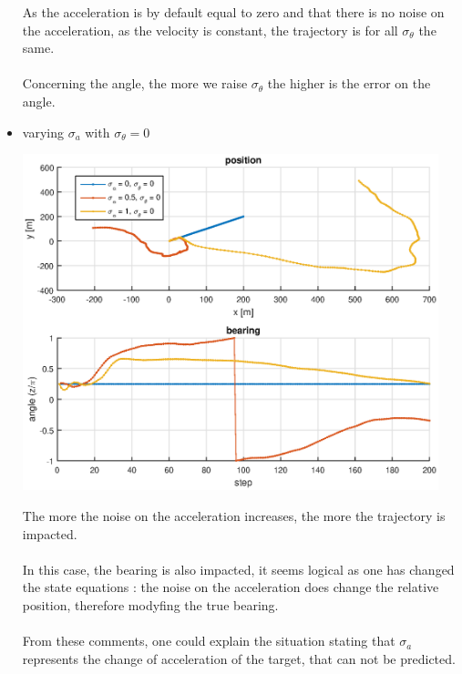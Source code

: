 \documentclass[english,DIV=13]{scrartcl}
\begin{document}
\begin{itemize}
\begin{center}
\begin{minipage}{.5\textwidth}
	\end{minipage}%
	\begin{minipage}{.5\textwidth}
		As the acceleration is by default equal to zero and that there is no noise on the acceleration, as the velocity is
		constant, the trajectory is for all $\sigma_{\theta}$ the same. \\\\
		Concerning the angle, the more we raise $\sigma_{\theta}$ the higher is the error on the angle.
	\end{minipage}
\end{center}
\item varying $\sigma_a$ with $\sigma_\theta=0$
\begin{center}
	\begin{minipage}{.5\textwidth}
		\includegraphics[width=0.95\textwidth]{img/q2_3.eps}
	\end{minipage}%
	\begin{minipage}{.5\textwidth}
		The more the noise on the acceleration increases, the more the trajectory is impacted. \\\\
		In this case, the bearing is also impacted, it seems logical as one has changed the state equations :
		the noise on the acceleration does change the relative position, therefore modyfing the true bearing. \\\\
		From these comments, one could explain the situation stating that $\sigma_a$ represents the change of 
		acceleration of the target, that can not be predicted.
	\end{minipage}

\end{center}
\end{itemize}
\end{document}
